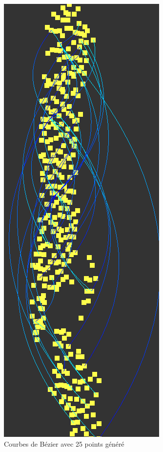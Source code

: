 \documentclass[12pt]{article}
\begin{document}
		\begin{figure}[!h]
		\begin{center}
		\includegraphics[scale=.60]{25_generated_points.png}
		\caption{Courbes de Bézier avec 25 points généré}
		\end{center}
		\end{figure}
		\clearpage
				
		
\end{document}
